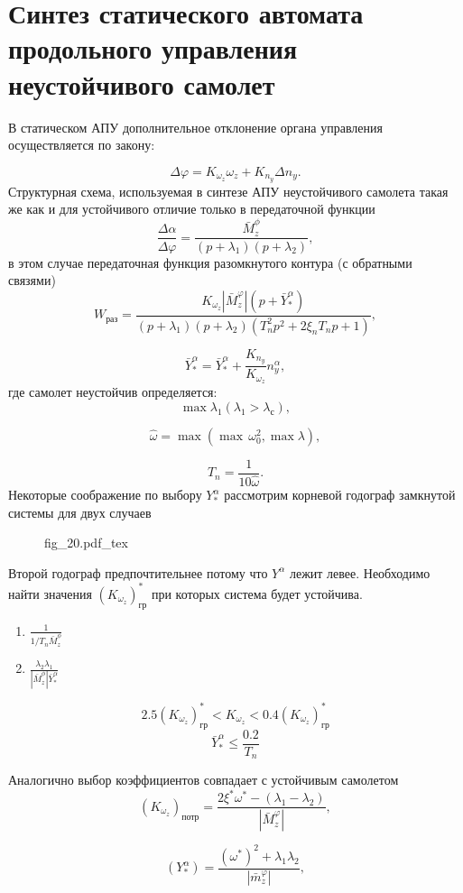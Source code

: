 \documentclass{article}
\begin{document}
\section{Синтез статического автомата продольного управления неустойчивого
	самолет}
В статическом АПУ дополнительное отклонение органа управления осуществляется по
закону:

\[
	\Delta \varphi = K_{\omega_{z}} \omega_z + K_{n_y} \Delta n_y.
\]
Структурная схема, используемая в синтезе АПУ неустойчивого самолета такая же
как и для устойчивого отличие только в передаточной функции
\[
	{\frac{\Delta \alpha}{\Delta \varphi} } =
	\frac{\bar{M}_z^\phi}{(p+\lambda_1)(p+\lambda_2)},
\]
в этом случае передаточная функция разомкнутого контура (с обратными связями)
\[
	W_\text{раз} = \frac{K_{\omega_z} |\bar{M}_z^\varphi |(p + \bar{Y}^\alpha_*)
	}{(p+\lambda_1)(p+\lambda_2)(T_n^2 p^2 + 2 \xi_n T_n p +1)},
\]

\[
	\bar{Y}_*^\alpha = \bar{Y}_*^\alpha + \frac{K_{n_y}}{K_{\omega_z}}
	n_y^\alpha,
\]
где самолет неустойчив определяется:
\[
	\max \lambda_1 (\lambda_1 > \lambda_\text{с}),
\]

\[
	\hat{\omega} = \max(\max \, \omega_0^2, \max \lambda),
\]

\[
	T_n = \frac{1}{10 \hat{\omega}}.
\]
Некоторые соображение по выбору $Y_*^\alpha$ рассмотрим корневой годограф
замкнутой системы для двух случаев
\begin{figure}[ht]
	\centering
	{fig_20.pdf_tex}
\end{figure}

Второй годограф предпочтительнее потому что $Y^\alpha$ лежит левее.
Необходимо найти значения $(K_{\omega_z})_\text{гр}^*$ при которых система
будет устойчива.
\begin{enumerate}
	\item $\frac{1}{1/T_n \bar{M}_z^\phi}$
	\item $\frac{\lambda_2 \lambda_1}{| \bar{M}_z^\phi|\bar{Y}_*^\alpha}$
\end{enumerate}
\[
	2.5 (K_{\omega_z})^*_\text{гр} < K_{\omega_z} <
	0.4(K_{\omega_z})^*_\text{гр}
\]
\[
	\bar{Y}_*^\alpha \le \frac{0.2}{T_n}
\]

Аналогично выбор коэффициентов совпадает с устойчивым самолетом
\[
	(K_{\omega_z})_\text{потр} = \frac{2 \xi^* \omega^* - (\lambda_1 -
		\lambda_2)}{|\bar{M}_z^\varphi|},
\]

\[
	(Y_*^\alpha) = \frac{(\omega^*)^2 + \lambda_1
		\lambda_2}{|\bar{m}_z^\varphi|},
\]
\end{document}
